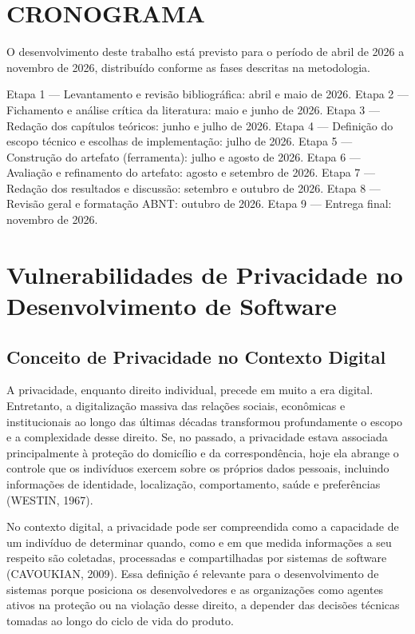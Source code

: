 \documentclass[oneside]{normas-utf-tex}
\begin{document}
\chapter{CRONOGRAMA}

O desenvolvimento deste trabalho está previsto para o período de abril de 2026 a novembro de 2026, distribuído conforme as fases descritas na metodologia.

Etapa 1 — Levantamento e revisão bibliográfica: abril e maio de 2026. Etapa 2 — Fichamento e análise crítica da literatura: maio e junho de 2026. Etapa 3 — Redação dos capítulos teóricos: junho e julho de 2026. Etapa 4 — Definição do escopo técnico e escolhas de implementação: julho de 2026. Etapa 5 — Construção do artefato (ferramenta): julho e agosto de 2026. Etapa 6 — Avaliação e refinamento do artefato: agosto e setembro de 2026. Etapa 7 — Redação dos resultados e discussão: setembro e outubro de 2026. Etapa 8 — Revisão geral e formatação ABNT: outubro de 2026. Etapa 9 — Entrega final: novembro de 2026.

\chapter{Vulnerabilidades de Privacidade no Desenvolvimento de Software}

\section{Conceito de Privacidade no Contexto Digital}

A privacidade, enquanto direito individual, precede em muito a era digital. Entretanto, a digitalização massiva das relações sociais, econômicas e institucionais ao longo das últimas décadas transformou profundamente o escopo e a complexidade desse direito. Se, no passado, a privacidade estava associada principalmente à proteção do domicílio e da correspondência, hoje ela abrange o controle que os indivíduos exercem sobre os próprios dados pessoais, incluindo informações de identidade, localização, comportamento, saúde e preferências (WESTIN, 1967).

No contexto digital, a privacidade pode ser compreendida como a capacidade de um indivíduo de determinar quando, como e em que medida informações a seu respeito são coletadas, processadas e compartilhadas por sistemas de software (CAVOUKIAN, 2009). Essa definição é relevante para o desenvolvimento de sistemas porque posiciona os desenvolvedores e as organizações como agentes ativos na proteção ou na violação desse direito, a depender das decisões técnicas tomadas ao longo do ciclo de vida do produto.
\end{document}
